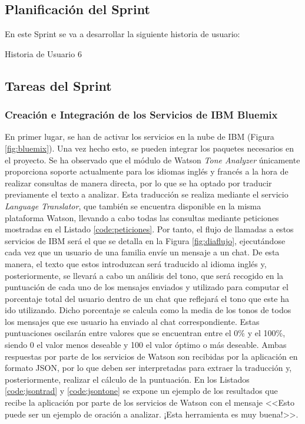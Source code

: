 \subsection{Planificación del Sprint}
En este Sprint se va a desarrollar la siguiente historia de usuario:

\begin{table}[hp]
	\centering
	{\small
		
	}
	\caption[Historia de Usuario 6]
	{Historia de Usuario 6}
	\label{tab:historia6}
\end{table}

\clearpage

\subsection{Tareas del Sprint}
\subsubsection{Creación e Integración de los Servicios de IBM Bluemix}
En primer lugar, se han de activar los servicios en la nube de IBM (Figura \ref{fig:bluemix}). Una vez hecho esto, se pueden integrar los paquetes necesarios en el proyecto. Se ha observado que el módulo de Watson \textit{Tone Analyzer} únicamente proporciona soporte actualmente para los idiomas inglés y francés a la hora de realizar consultas de manera directa, por lo que se ha optado por traducir previamente el texto a analizar. Esta traducción se realiza mediante el servicio \textit{Language Translator}, que también se encuentra disponible en la misma plataforma Watson, llevando a cabo todas las consultas mediante peticiones mostradas en el Listado \ref{code:peticiones}. Por tanto, el flujo de llamadas a estos servicios de IBM será el que se detalla en la Figura \ref{fig:diaflujo}, ejecutándose cada vez que un usuario de una familia envíe un mensaje a un chat. De esta manera, el texto que estos introduzcan será traducido al idioma inglés y, posteriormente, se llevará a cabo un análisis del tono, que será recogido en la puntuación de cada uno de los mensajes enviados y utilizado para computar el porcentaje total del usuario dentro de un chat que reflejará el tono que este ha ido utilizando. Dicho porcentaje se calcula como la media de los tonos de todos los mensajes que ese usuario ha enviado al chat correspondiente. Estas puntuaciones oscilarán entre valores que se encuentran entre el 0\% y el 100\%, siendo 0 el valor menos deseable y 100 el valor óptimo o más deseable. Ambas respuestas por parte de los servicios de Watson son recibidas por la aplicación en formato \acf{JSON}, por lo que deben ser interpretadas para extraer la traducción y, posteriormente, realizar el cálculo de la puntuación. En los Listados \ref{code:jsontrad} y \ref{code:jsontone} se expone un ejemplo de los resultados que recibe la aplicación por parte de los servicios de Watson con el mensaje <<Esto puede ser un ejemplo de oración a analizar. ¡Esta herramienta es muy buena!>>.

